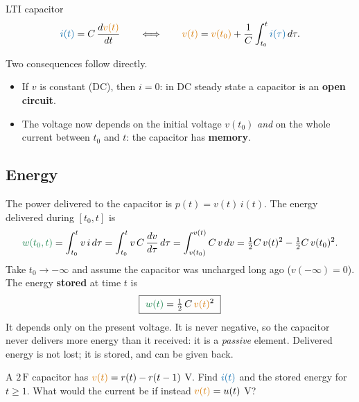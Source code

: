 \documentclass[11pt,a4paper]{article}
\newcommand{\Icol}[1]{\textcolor{ccur}{#1}}
\newcommand{\Vcol}[1]{\textcolor{cvolt}{#1}}
\newcommand{\Pcol}[1]{\textcolor{cpow}{#1}}
\newif\ifsolfirst
\newcommand{\solution}{\par\smallskip\noindent{\color{cpow}\bfseries Solution}\par\nobreak\smallskip\global\solfirsttrue}
\newcommand{\F}{\,\mathrm{F}}
\begin{document}
\begin{definitionbox}{LTI capacitor}
\[
  \Icol{i(t)} = C\,\frac{d\Vcol{v(t)}}{dt}
  \qquad\Longleftrightarrow\qquad
  \Vcol{v(t)} = \Vcol{v(t_0)} + \frac{1}{C}\int_{t_0}^{t} \Icol{i(\tau)}\,d\tau .
\]
\end{definitionbox}

Two consequences follow directly.
\begin{itemize}
  \item If $v$ is constant (DC), then $i = 0$: in DC steady state a capacitor is an \textbf{open
        circuit}.
  \item The voltage now depends on the initial voltage $v(t_0)$ \emph{and} on the whole current
        between $t_0$ and $t$: the capacitor has \textbf{memory}.
\end{itemize}

\subsection{Energy}

The power delivered to the capacitor is $p(t) = v(t)\,i(t)$. The energy delivered during
$[t_0, t]$ is
\[
  \Pcol{w(t_0, t)} = \int_{t_0}^{t} v\,i\,d\tau = \int_{t_0}^{t} v\,C\,\frac{dv}{d\tau}\,d\tau
  = \int_{v(t_0)}^{v(t)} C\,v\,dv = \tfrac12 C\,v(t)^2 - \tfrac12 C\,v(t_0)^2 .
\]
Take $t_0 \to -\infty$ and assume the capacitor was uncharged long ago ($v(-\infty) = 0$). The
energy \textbf{stored} at time $t$ is
\[
  \boxed{\ \Pcol{w(t)} = \tfrac12\,C\,\Vcol{v(t)}^2 \ }
\]
It depends only on the present voltage. It is never negative, so the capacitor never delivers
more energy than it received: it is a \emph{passive} element. Delivered energy is not lost; it is
stored, and can be given back.

\begin{examplebox}
A $2\F$ capacitor has $\Vcol{v(t)} = r(t) - r(t - 1)$ V. Find $\Icol{i(t)}$ and the stored energy
for $t \geq 1$. What would the current be if instead $\Vcol{v(t)} = u(t)$ V?
\end{examplebox}

\solution
\end{document}
